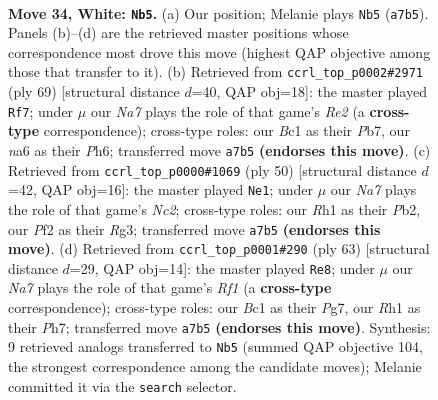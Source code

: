 \documentclass[11pt]{article}
\begin{document}
\clearpage

\begin{figure}[p]\centering
\begin{subfigure}{0.46\textwidth}\centering
\resizebox{\linewidth}{!}{%
\newchessgame
\chessboard[
  setfen={5r2/Nppkp2p/n5p1/p7/5P1P/2P5/P1n2PK1/2B4R w - - 13 34},
  showmover=false,
  pgfstyle=straightmove, color=movearrow, markmove={a7-b5}
]}
\caption{}
\end{subfigure}\hfill
\begin{subfigure}{0.46\textwidth}\centering
\resizebox{\linewidth}{!}{%
\newchessgame
\chessboard[
  setfen={8/1pp1r1k1/3p2pp/8/1nP2P2/1PN3PP/5K2/3R4 b - - 1 35},
  showmover=false,
  pgfstyle=straightmove, color=movearrow, markmove={e7-f7}
]}
\caption{}
\end{subfigure}
\\[4pt]
\begin{subfigure}{0.46\textwidth}\centering
\resizebox{\linewidth}{!}{%
\newchessgame
\chessboard[
  setfen={3r2k1/1p3p1p/2b3p1/p1n5/2P3P1/5PR1/PPN4P/2K2B2 w - - 0 26},
  showmover=false,
  pgfstyle=straightmove, color=movearrow, markmove={c2-e1}
]}
\caption{}
\end{subfigure}\hfill
\begin{subfigure}{0.46\textwidth}\centering
\resizebox{\linewidth}{!}{%
\newchessgame
\chessboard[
  setfen={5r1k/2p2ppp/1n6/1p6/1p1PN3/1P5P/5PP1/2R3K1 b - - 2 32},
  showmover=false,
  pgfstyle=straightmove, color=movearrow, markmove={f8-e8}
]}
\caption{}
\end{subfigure}
\caption{\textbf{Move 34, White: \texttt{Nb5}.} (a) Our position; Melanie plays \texttt{Nb5} (\texttt{a7b5}). Panels (b)--(d) are the retrieved master positions whose correspondence most drove this move (highest QAP objective among those that transfer to it). (b) Retrieved from \texttt{ccrl\_top\_p0002\#2971} (ply 69) [structural distance $d$=40, QAP obj=18]: the master played \texttt{Rf7}; under $\mu$ our \emph{Na7} plays the role of that game's \emph{Re2} (a \textbf{cross-type} correspondence); cross-type roles: our \emph{B}c1 as their \emph{P}b7, our \emph{n}a6 as their \emph{P}h6; transferred move \texttt{a7b5} \textbf{(endorses this move)}. (c) Retrieved from \texttt{ccrl\_top\_p0000\#1069} (ply 50) [structural distance $d$=42, QAP obj=16]: the master played \texttt{Ne1}; under $\mu$ our \emph{Na7} plays the role of that game's \emph{Nc2}; cross-type roles: our \emph{R}h1 as their \emph{P}b2, our \emph{P}f2 as their \emph{R}g3; transferred move \texttt{a7b5} \textbf{(endorses this move)}. (d) Retrieved from \texttt{ccrl\_top\_p0001\#290} (ply 63) [structural distance $d$=29, QAP obj=14]: the master played \texttt{Re8}; under $\mu$ our \emph{Na7} plays the role of that game's \emph{Rf1} (a \textbf{cross-type} correspondence); cross-type roles: our \emph{B}c1 as their \emph{P}g7, our \emph{R}h1 as their \emph{P}h7; transferred move \texttt{a7b5} \textbf{(endorses this move)}. Synthesis: 9 retrieved analogs transferred to \texttt{Nb5} (summed QAP objective 104, the strongest correspondence among the candidate moves); Melanie committed it via the \texttt{search} selector.}
\label{fig:thought-m66}
\end{figure}
\end{document}
